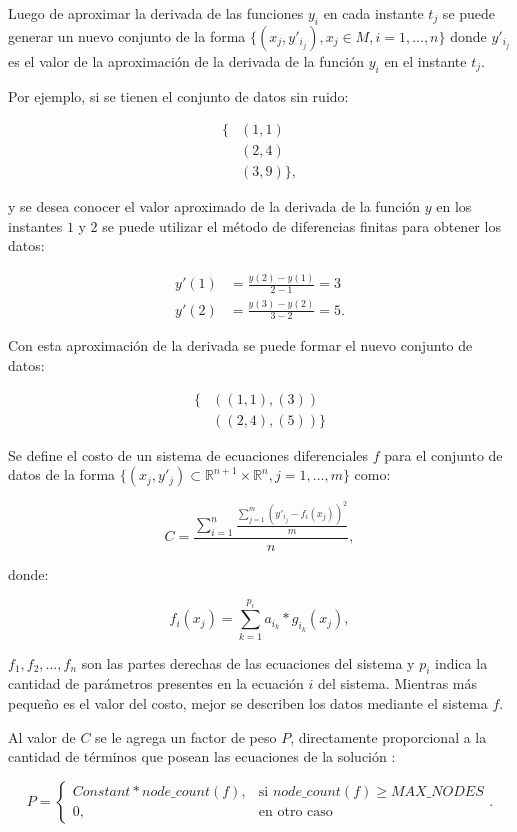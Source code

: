 Luego de aproximar la derivada de las funciones $y_i$ en cada instante $t_j$ se puede generar un nuevo conjunto de la forma $\{(x_j, y'_{i_j}), x_j \in M, i = 1, \dots, n\}$ donde $y'_{i_j}$ es el valor de la aproximación de la derivada de la función $y_i$ en el instante $t_j$.

Por ejemplo, si se tienen el conjunto de datos sin ruido:

\begin{align*}
    \{ & (1, 1)     \\
       & (2, 4)     \\
       & (3, 9) \},
\end{align*}

y se desea conocer el valor aproximado de la derivada de la función $y$ en los instantes $1$ y $2$ se puede utilizar el método de diferencias finitas para obtener los datos:

\begin{align*}
    y'(1) & = \frac{y(2) - y(1)}{2 - 1} = 3  \\
    y'(2) & = \frac{y(3) - y(2)}{3 - 2} = 5.
\end{align*}

Con esta aproximación de la derivada se puede formar el nuevo conjunto de datos:

\begin{align*}
    \{ & ((1, 1), (3))    \\
       & ((2, 4), (5)) \}
\end{align*}

Se define el costo de un sistema de ecuaciones diferenciales $f$ para el conjunto de datos de la forma $\{(x_j, y'_j) \subset \mathbb{R}^{n+1} \times \mathbb{R}^n, j = 1, \dots, m\}$ como:

$$C = \frac{\sum_{i=1}^n\frac{\sum_{j=1}^{m}(y'_{i_j} - f_i(x_j))^2}{m}}{n},$$

donde:

$$f_i(x_j) = \sum_{k=1}^{p_i} a_{i_k} * g_{i_k}(x_j),$$

$f_1, f_2, \dots, f_n$ son las partes derechas de las ecuaciones del sistema y $p_i$ indica la cantidad de parámetros presentes en la ecuación $i$ del sistema. Mientras más pequeño es el valor del costo, mejor se describen los datos mediante el sistema $f$.

Al valor de $C$ se le agrega un factor de peso $P$, directamente proporcional a la cantidad de términos que posean las ecuaciones de la solución \cite{gplearnbloat}:

$$P = \begin{cases}
        Constant * node\_count(f), & \text{si } node\_count(f) \geq MAX\_NODES \\
        0,                         & \text{en otro caso}
    \end{cases}.$$

